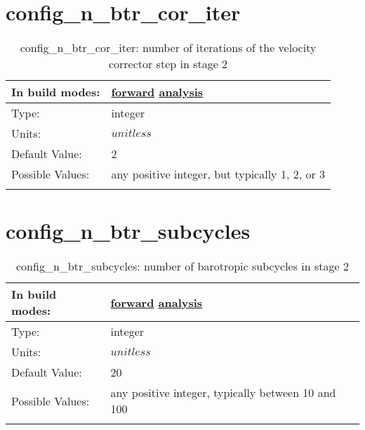 \section[config\_n\_btr\_cor\_iter]{config\_n\_btr\_cor\_iter}
\label{sec:nm_sec_config_n_btr_cor_iter}
\begin{center}
\begin{longtable}{| p{2.0in} || p{4.0in} |}
    \hline
    In build modes: & \hyperref[subsec:forward_nm_tab_split_explicit_ts]{forward} \hyperref[subsec:analysis_nm_tab_split_explicit_ts]{analysis} \\
    \hline
    Type: & integer \\
    \hline
    Units: & $unitless$ \\
    \hline
    Default Value: & 2 \\
    \hline
    Possible Values: & any positive integer, but typically 1, 2, or 3 \\
    \hline
    \caption{config\_n\_btr\_cor\_iter: number of iterations of the velocity corrector step in stage 2}
\end{longtable}
\end{center}
\section[config\_n\_btr\_subcycles]{config\_n\_btr\_subcycles}
\label{sec:nm_sec_config_n_btr_subcycles}
\begin{center}
\begin{longtable}{| p{2.0in} || p{4.0in} |}
    \hline
    In build modes: & \hyperref[subsec:forward_nm_tab_split_explicit_ts]{forward} \hyperref[subsec:analysis_nm_tab_split_explicit_ts]{analysis} \\
    \hline
    Type: & integer \\
    \hline
    Units: & $unitless$ \\
    \hline
    Default Value: & 20 \\
    \hline
    Possible Values: & any positive integer, typically between 10 and 100 \\
    \hline
    \caption{config\_n\_btr\_subcycles: number of barotropic subcycles in stage 2}
\end{longtable}
\end{center}
